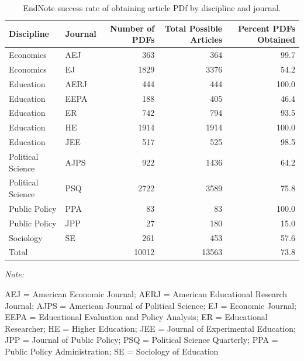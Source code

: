 \documentclass[
  english,
  ,man]{apa6}
\begin{document}
\begin{table}[!h]

\caption{\label{tab:setup}EndNote success rate of obtaining article PDf by discipline and journal.}
\centering
\begin{threeparttable}
\begin{tabular}[t]{llrrr}
\toprule
Discipline & Journal & Number of PDFs & Total Possible Articles & Percent PDFs Obtained\\
\midrule
Economics & AEJ & 363 & 364 & 99.7\\
Economics & EJ & 1829 & 3376 & 54.2\\
Education & AERJ & 444 & 444 & 100.0\\
Education & EEPA & 188 & 405 & 46.4\\
Education & ER & 742 & 794 & 93.5\\
\addlinespace
Education & HE & 1914 & 1914 & 100.0\\
Education & JEE & 517 & 525 & 98.5\\
Political Science & AJPS & 922 & 1436 & 64.2\\
Political Science & PSQ & 2722 & 3589 & 75.8\\
Public Policy & PPA & 83 & 83 & 100.0\\
\addlinespace
Public Policy & JPP & 27 & 180 & 15.0\\
Sociology & SE & 261 & 453 & 57.6\\
\hline
Total &  & 10012 & 13563 & 73.8\\
\bottomrule
\end{tabular}
\begin{tablenotes}
\item \textit{Note: } 
\item AEJ = American Economic Journal; AERJ = American Educational Research Journal; AJPS = American Journal of Political Science; EJ = Economic Journal; EEPA = Educational Evaluation and Policy Analysis; ER = Educational Researcher; HE = Higher Education; JEE = Journal of Experimental Education; JPP = Journal of Public Policy; PSQ = Political Science Quarterly; PPA = Public Policy Administration; SE = Sociology of Education
\end{tablenotes}
\end{threeparttable}
\end{table}
\end{document}
